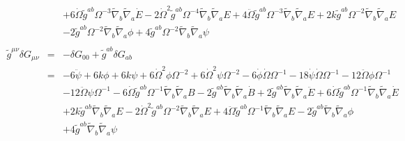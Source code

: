 \documentclass[10pt,letterpaper]{article}
\numberwithin{equation}{section}
\begin{document}
\begin{eqnarray}
&& + 6 \dot{\Omega} \tilde{g}^{ab} \Omega^{-3} \tilde{\nabla}_{b}\tilde{\nabla}_{a}\dot{E}
- 2 \dot{\Omega}^2 \tilde{g}^{ab} \Omega^{-4} \tilde{\nabla}_{b}\tilde{\nabla}_{a}E
+ 4 \ddot{\Omega} \tilde{g}^{ab} \Omega^{-3} \tilde{\nabla}_{b}\tilde{\nabla}_{a}E
+ 2 k \tilde{g}^{ab} \Omega^{-2} \tilde{\nabla}_{b}\tilde{\nabla}_{a}E\nonumber\\
&& - 2 \tilde{g}^{ab} \Omega^{-2} \tilde{\nabla}_{b}\tilde{\nabla}_{a}\phi
+ 4 \tilde{g}^{ab} \Omega^{-2} \tilde{\nabla}_{b}\tilde{\nabla}_{a}\psi
\\ \nonumber\\
\tilde g^{\mu\nu}\delta G_{\mu\nu}&=& -\delta G_{00} + \tilde g^{ab}\delta G_{ab}
\nonumber\\
&=&-6 \ddot{\psi}
+ 6 k \phi
+ 6 k \psi
+ 6 \dot{\Omega}^2 \phi \Omega^{-2}
+ 6 \dot{\Omega}^2 \psi \Omega^{-2}
- 6 \dot{\phi} \dot{\Omega} \Omega^{-1}
- 18 \dot{\psi} \dot{\Omega} \Omega^{-1}
- 12 \ddot{\Omega} \phi \Omega^{-1}\nonumber\\
&& - 12 \ddot{\Omega} \psi \Omega^{-1}
- 6 \dot{\Omega} \tilde{g}^{ab} \Omega^{-1} \tilde{\nabla}_{b}\tilde{\nabla}_{a}B
- 2 \tilde{g}^{ab} \tilde{\nabla}_{b}\tilde{\nabla}_{a}\dot{B}
+ 2 \tilde{g}^{ab} \tilde{\nabla}_{b}\tilde{\nabla}_{a}\ddot{E}
+ 6 \dot{\Omega} \tilde{g}^{ab} \Omega^{-1} \tilde{\nabla}_{b}\tilde{\nabla}_{a}\dot{E}\nonumber\\
&& + 2 k \tilde{g}^{ab} \tilde{\nabla}_{b}\tilde{\nabla}_{a}E
- 2 \dot{\Omega}^2 \tilde{g}^{ab} \Omega^{-2} \tilde{\nabla}_{b}\tilde{\nabla}_{a}E
+ 4 \ddot{\Omega} \tilde{g}^{ab} \Omega^{-1} \tilde{\nabla}_{b}\tilde{\nabla}_{a}E
- 2 \tilde{g}^{ab} \tilde{\nabla}_{b}\tilde{\nabla}_{a}\phi\nonumber\\
&& + 4 \tilde{g}^{ab} \tilde{\nabla}_{b}\tilde{\nabla}_{a}\psi
\end{eqnarray}

%
%
\end{document}
